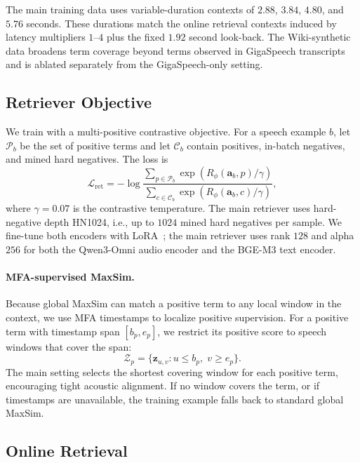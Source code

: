 The main training data uses variable-duration contexts of $2.88$, $3.84$, $4.80$, and $5.76$ seconds. These durations match the online retrieval contexts induced by latency multipliers $1$--$4$ plus the fixed $1.92$ second look-back. The Wiki-synthetic data broadens term coverage beyond terms observed in GigaSpeech transcripts and is ablated separately from the GigaSpeech-only setting.

\subsection{Retriever Objective}
\label{sec:retriever_objective}

We train with a multi-positive contrastive objective. For a speech example $b$, let $\mathcal{P}_b$ be the set of positive terms and let $\mathcal{C}_b$ contain positives, in-batch negatives, and mined hard negatives. The loss is
\begin{equation}
  \mathcal{L}_{\mathrm{ret}}
  =
  -\log
  \frac{
    \sum_{p\in\mathcal{P}_b}
    \exp(R_\phi(\mathbf{a}_b,p)/\gamma)
  }{
    \sum_{c\in\mathcal{C}_b}
    \exp(R_\phi(\mathbf{a}_b,c)/\gamma)
  },
\end{equation}
where $\gamma=0.07$ is the contrastive temperature. The main retriever uses hard-negative depth HN1024, i.e., up to $1024$ mined hard negatives per sample. We fine-tune both encoders with LoRA~\citep{hu2022lora}; the main retriever uses rank $128$ and alpha $256$ for both the Qwen3-Omni audio encoder and the BGE-M3 text encoder.

\paragraph{MFA-supervised MaxSim.}
Because global MaxSim can match a positive term to any local window in the context, we use MFA timestamps to localize positive supervision. For a positive term with timestamp span $[b_p,e_p]$, we restrict its positive score to speech windows that cover the span:
\begin{equation}
  \mathcal{Z}_p
  =
  \{\mathbf{z}_{u,v}: u \le b_p,\; v \ge e_p\}.
\end{equation}
The main setting selects the shortest covering window for each positive term, encouraging tight acoustic alignment. If no window covers the term, or if timestamps are unavailable, the training example falls back to standard global MaxSim.

\subsection{Online Retrieval}
\label{sec:retriever_inference}

